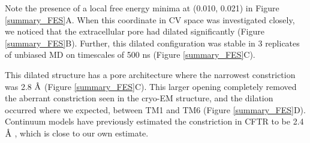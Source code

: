 Note the presence of a local free energy minima at (0.010, 0.021) in Figure \ref{summary_FES}A. When this coordinate in CV space was investigated closely, we noticed that the extracellular pore had dilated significantly (Figure \ref{summary_FES}B). Further, this dilated configuration was stable in 3 replicates of unbiased MD on timescales of 500 ns (Figure \ref{summary_FES}C). 

This dilated structure has a pore architecture where the narrowest constriction was 2.8 $\textup{\AA}$ (Figure \ref{summary_FES}C). This larger opening completely removed the aberrant constriction seen in the cryo-EM structure, and the dilation occurred where we expected, between TM1 and TM6 (Figure \ref{summary_FES}D). Continuum models have previously estimated the constriction in CFTR to be 2.4 $\textup{\AA}$ \cite{jun2016}, which is close to our own estimate. 

